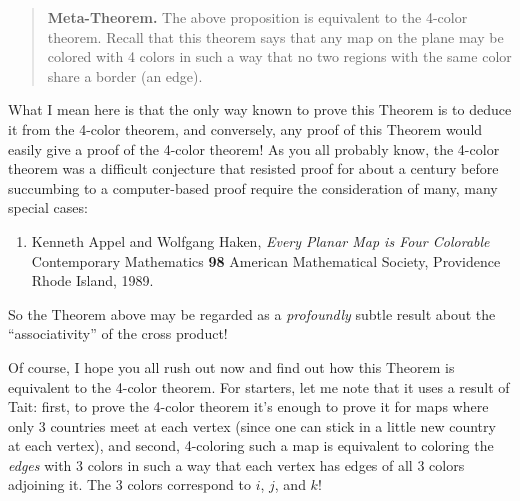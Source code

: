 \documentclass[12pt]{article}
\begin{document}
\begin{quote}
{\rm 
\textbf{Meta-Theorem.} The above proposition is equivalent to the
4-color theorem. Recall that this theorem says that any map on the plane
may be colored with 4 colors in such a way that no two regions with the
same color share a border (an edge).
}
\end{quote}

What I mean here is that the only way known to prove this Theorem is to
deduce it from the 4-color theorem, and conversely, any proof of this
Theorem would easily give a proof of the 4-color theorem! As you all
probably know, the 4-color theorem was a difficult conjecture that
resisted proof for about a century before succumbing to a computer-based
proof require the consideration of many, many special cases:

\begin{enumerate}
\def\labelenumi{\arabic{enumi})}
\setcounter{enumi}{3}
\item
  Kenneth Appel and Wolfgang Haken, \emph{Every Planar Map is Four Colorable}
  Contemporary Mathematics \textbf{98} American Mathematical Society, Providence
  Rhode Island, 1989.
\end{enumerate}

So the Theorem above may be regarded as a \emph{profoundly} subtle
result about the ``associativity'' of the cross product!

Of course, I hope you all rush out now and find out how this Theorem is
equivalent to the 4-color theorem. For starters, let me note that it
uses a result of Tait: first, to prove the 4-color theorem it's enough
to prove it for maps where only 3 countries meet at each vertex (since
one can stick in a little new country at each vertex), and second,
4-coloring such a map is equivalent to coloring the \emph{edges} with 3
colors in such a way that each vertex has edges of all 3 colors
adjoining it. The 3 colors correspond to \(i\), \(j\), and \(k\)!
\end{document}
